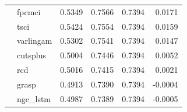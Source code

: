 \begin{table}[t]
\begin{tabular}{llrrrr}
 & fpcmci & 0.5349 & 0.7566 & 0.7394 & 0.0171\\
 & tsci & 0.5424 & 0.7554 & 0.7394 & 0.0159\\
 & varlingam & 0.5302 & 0.7541 & 0.7394 & 0.0147\\
 & cutsplus & 0.5004 & 0.7446 & 0.7394 & 0.0052\\
 & rcd & 0.5016 & 0.7415 & 0.7394 & 0.0021\\
 & grasp & 0.4913 & 0.7390 & 0.7394 & -0.0004\\
 & ngc\_lstm & 0.4987 & 0.7389 & 0.7394 & -0.0005\\
\bottomrule\end{tabular}\end{table}

